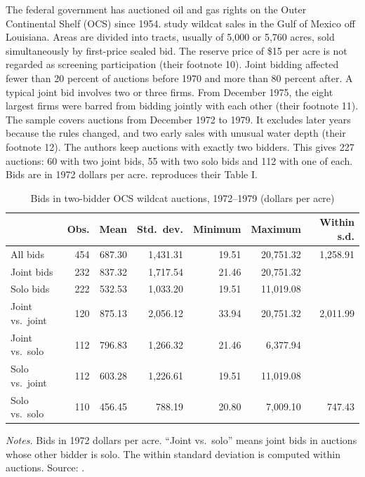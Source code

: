  The federal government has auctioned oil and gas rights on the Outer Continental
Shelf (OCS) since 1954. \citet{CampoPerrigneVuong2003} study wildcat sales in the Gulf of Mexico off Louisiana. Areas
are divided into tracts, usually of 5,000 or 5,760 acres, sold simultaneously by first-price sealed bid. The
reserve price of \$15 per acre is not regarded as screening participation (their footnote 10). Joint bidding
affected fewer than 20 percent of auctions before 1970 and more than 80 percent after. A typical joint bid
involves two or three firms. From December 1975, the eight largest firms were barred from bidding jointly
with each other (their footnote 11). The sample covers auctions from December 1972 to 1979. It excludes later
years because the rules changed, and two early sales with unusual water depth (their footnote 12). The
authors keep auctions with exactly two bidders. This gives 227 auctions: 60 with two joint bids, 55 with two
solo bids and 112 with one of each. Bids are in 1972 dollars per acre.  reproduces
their Table I.

\begin{table}[htbp]
\centering
\caption{Bids in two-bidder OCS wildcat auctions, 1972--1979 (dollars per acre)}\label{tab:15-cpv-stats}
\begin{tabular}{@{}lrrrrrr@{}}
\toprule
 & Obs. & Mean & Std.\ dev. & Minimum & Maximum & Within s.d. \\
\midrule
All bids & 454 & 687.30 & 1,431.31 & 19.51 & 20,751.32 & 1,258.91 \\
Joint bids & 232 & 837.32 & 1,717.54 & 21.46 & 20,751.32 & \\
Solo bids & 222 & 532.53 & 1,033.20 & 19.51 & 11,019.08 & \\
Joint vs.\ joint & 120 & 875.13 & 2,056.12 & 33.94 & 20,751.32 & 2,011.99 \\
Joint vs.\ solo & 112 & 796.83 & 1,266.32 & 21.46 & 6,377.94 & \\
Solo vs.\ joint & 112 & 603.28 & 1,226.61 & 19.51 & 11,019.08 & \\
Solo vs.\ solo & 110 & 456.45 & 788.19 & 20.80 & 7,009.10 & 747.43 \\
\bottomrule
\end{tabular}

\smallskip
\begin{minipage}{0.92\textwidth}
\footnotesize \textit{Notes.} Bids in 1972 dollars per acre. ``Joint vs.\ solo'' means joint bids in auctions whose
other bidder is solo. The within standard deviation is computed within auctions. Source:
\citet[Table~I]{CampoPerrigneVuong2003}.
\end{minipage}
\end{table}


